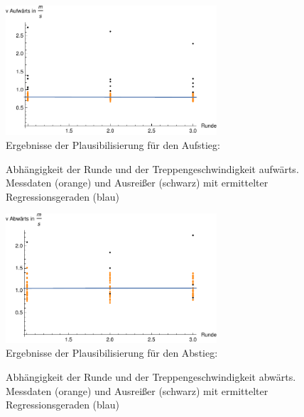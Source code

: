 	
	
	
	
	
	
	
	
	
	
	\begin{figure}[htpb]
		\centering
		\includegraphics[width=0.7\textwidth]{abbildungen/regression/2012_2017_verbund/ohneausreisser/auf-runde.pdf}
		\justify \ \\
		Ergebnisse der Plausibilisierung für den Aufstieg:
		
		\caption{Abhängigkeit der Runde und der Treppengeschwindigkeit aufwärts. Messdaten (orange) und Ausreißer (schwarz) mit ermittelter Regressionsgeraden (blau)}
		\label{fig:2012_und_2017_MA_auf_runde}
	\end{figure}
	
	
	
	\begin{figure}[htpb]
		\centering
		\includegraphics[width=0.7\textwidth]{abbildungen/regression/2012_2017_verbund/ohneausreisser/ab-runde.pdf}
		\justify \ \\
		Ergebnisse der Plausibilisierung für den Abstieg:
		
		\caption{Abhängigkeit der Runde und der Treppengeschwindigkeit abwärts. Messdaten (orange) und Ausreißer (schwarz) mit ermittelter Regressionsgeraden (blau)}
		\label{fig:2012_und_2017_MA_ab_runde}
	\end{figure}
	

